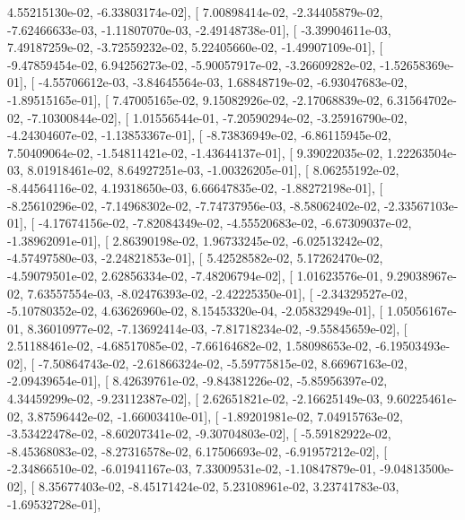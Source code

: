 \documentclass{article}
\begin{document}
          4.55215130e-02,  -6.33803174e-02],
       [  7.00898414e-02,  -2.34405879e-02,  -7.62466633e-03,
         -1.11807070e-03,  -2.49148738e-01],
       [ -3.39904611e-03,   7.49187259e-02,  -3.72559232e-02,
          5.22405660e-02,  -1.49907109e-01],
       [ -9.47859454e-02,   6.94256273e-02,  -5.90057917e-02,
         -3.26609282e-02,  -1.52658369e-01],
       [ -4.55706612e-03,  -3.84645564e-03,   1.68848719e-02,
         -6.93047683e-02,  -1.89515165e-01],
       [  7.47005165e-02,   9.15082926e-02,  -2.17068839e-02,
          6.31564702e-02,  -7.10300844e-02],
       [  1.01556544e-01,  -7.20590294e-02,  -3.25916790e-02,
         -4.24304607e-02,  -1.13853367e-01],
       [ -8.73836949e-02,  -6.86115945e-02,   7.50409064e-02,
         -1.54811421e-02,  -1.43644137e-01],
       [  9.39022035e-02,   1.22263504e-03,   8.01918461e-02,
          8.64927251e-03,  -1.00326205e-01],
       [  8.06255192e-02,  -8.44564116e-02,   4.19318650e-03,
          6.66647835e-02,  -1.88272198e-01],
       [ -8.25610296e-02,  -7.14968302e-02,  -7.74737956e-03,
         -8.58062402e-02,  -2.33567103e-01],
       [ -4.17674156e-02,  -7.82084349e-02,  -4.55520683e-02,
         -6.67309037e-02,  -1.38962091e-01],
       [  2.86390198e-02,   1.96733245e-02,  -6.02513242e-02,
         -4.57497580e-03,  -2.24821853e-01],
       [  5.42528582e-02,   5.17262470e-02,  -4.59079501e-02,
          2.62856334e-02,  -7.48206794e-02],
       [  1.01623576e-01,   9.29038967e-02,   7.63557554e-03,
         -8.02476393e-02,  -2.42225350e-01],
       [ -2.34329527e-02,  -5.10780352e-02,   4.63626960e-02,
          8.15453320e-04,  -2.05832949e-01],
       [  1.05056167e-01,   8.36010977e-02,  -7.13692414e-03,
         -7.81718234e-02,  -9.55845659e-02],
       [  2.51188461e-02,  -4.68517085e-02,  -7.66164682e-02,
          1.58098653e-02,  -6.19503493e-02],
       [ -7.50864743e-02,  -2.61866324e-02,  -5.59775815e-02,
          8.66967163e-02,  -2.09439654e-01],
       [  8.42639761e-02,  -9.84381226e-02,  -5.85956397e-02,
          4.34459299e-02,  -9.23112387e-02],
       [  2.62651821e-02,  -2.16625149e-03,   9.60225461e-02,
          3.87596442e-02,  -1.66003410e-01],
       [ -1.89201981e-02,   7.04915763e-02,  -3.53422478e-02,
         -8.60207341e-02,  -9.30704803e-02],
       [ -5.59182922e-02,  -8.45368083e-02,  -8.27316578e-02,
          6.17506693e-02,  -6.91957212e-02],
       [ -2.34866510e-02,  -6.01941167e-03,   7.33009531e-02,
         -1.10847879e-01,  -9.04813500e-02],
       [  8.35677403e-02,  -8.45171424e-02,   5.23108961e-02,
          3.23741783e-03,  -1.69532728e-01],
\end{document}
